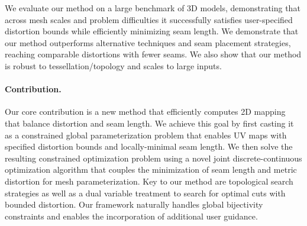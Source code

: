 

We evaluate our method on a large benchmark of 3D models, demonstrating that across mesh scales and problem difficulties it successfully satisfies user-specified distortion bounds while efficiently minimizing seam length. We demonstrate that our method outperforms alternative techniques and seam placement strategies, reaching comparable distortions with fewer seams. We also show that our method is robust to tessellation/topology and scales to large inputs.%

\paragraph{Contribution.}
Our core contribution is a new method that efficiently computes 2D mapping that balance distortion and seam length. We achieve this goal by first casting it as a constrained global parameterization problem that enables UV maps with specified distortion bounds and locally-minimal seam length. 
We then solve the resulting constrained optimization problem using a novel  joint discrete-continuous optimization algorithm that couples the minimization of seam length and metric distortion for mesh parameterization. 
Key to our method are topological search strategies as well as a dual variable treatment to search for optimal cuts with bounded distortion. Our framework naturally handles global bijectivity constraints and enables the incorporation of additional user guidance.

